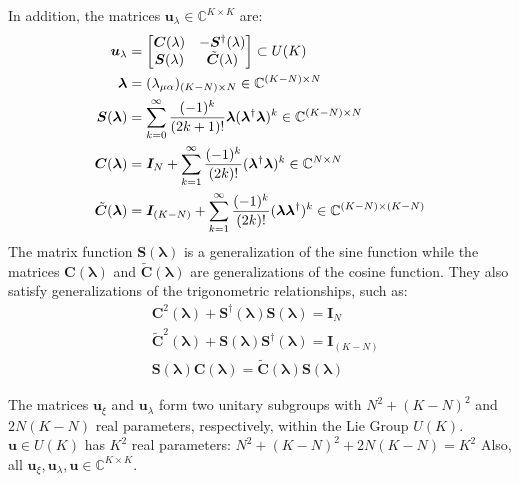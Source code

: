 \documentclass{aux/ttuthes2007}
\newcommand{\paren}[1]{\left( #1 \right)}
\newcommand{\elec}{N}
\newcommand{\orb}{K}
\newcommand{\uo}[1]{
		\IfEqCase{#1}{
			{0}{\mu}
			{1}{\nu}
			{2}{\xi}
		}[\PackageError{uo}{Undefined option to uo: #1}{}]
}
\newcommand{\oo}[1]{
		\IfEqCase{#1}{
			{0}{\alpha}
			{1}{\beta}
			{2}{\gamma}
		}[\PackageError{unocorb}{Undefined option to unuo: #1}{}]
}
\begin{document}
%
In addition, the matrices $\bm u_\lambda \in \mathbb{C}^{\orb \times \orb}$ are:
%
\begin{equation}
\begin{split}
	\label{eq:ulambda}
	\bm u_\lambda &= \begin{bmatrix}\bm C(\lambda) & -\bm S^\dagger(\lambda) \\ \bm S(\lambda) & \tilde {\bm C}(\lambda)\end{bmatrix} \subset U(\orb) \\
	\bm \lambda &= (\lambda_{\uo 0 \oo 0})_{(\orb - \elec)\times \elec} \in \mathbb{C}^{\paren{\orb - \elec} \times \elec} \\
	\bm S(\bm \lambda) &= \sum_{k=0}^\infty \frac{(-1)^k}{(2k + 1)!}\bm \lambda(\bm \lambda^\dagger\bm \lambda)^k \in \mathbb{C}^{\paren{\orb - \elec} \times \elec}\\
	\bm C(\bm \lambda) &= \bm I_\elec + \sum_{k=1}^\infty \frac{(-1)^k}{(2k)!}(\bm \lambda^\dagger\bm \lambda)^k \in \mathbb{C}^{\elec \times \elec}\\
	\tilde {\bm C}(\bm \lambda) &= \bm I_{(\orb - \elec)} + \sum_{k=1}^\infty \frac{(-1)^k}{(2k)!}(\bm \lambda\bm \lambda^\dagger)^k \in \mathbb{C}^{\paren{\orb - \elec} \times \paren{\orb - \elec}}
\end{split}
\end{equation}
%
The matrix function $\bm S(\bm \lambda)$ is a generalization of the sine function while the matrices $\bm C(\bm \lambda)$ and $\tilde {\bm C}(\bm \lambda)$ are generalizations of the cosine function. They also satisfy generalizations of the trigonometric relationships, such as:
%
\begin{equation*}
\begin{split}
	&\bm C^2(\bm \lambda) + \bm S^\dagger(\bm \lambda)\bm S(\bm \lambda) = \bm I_{\elec} \\
	&\tilde{\bm C}^2(\bm \lambda) + \bm S(\bm \lambda)\bm S^\dagger(\bm \lambda) = \bm I_{\paren{\orb - \elec}} \\
	&\bm S(\bm \lambda)\bm C(\bm \lambda) = \tilde{\bm C}(\bm \lambda)\bm S(\bm \lambda)
\end{split}
\end{equation*}

The matrices $\bm u_\xi$ and $\bm u_\lambda$ form two unitary subgroups with 
$\elec^2 + \paren{\orb - \elec}^2$ 
and 
$2\elec\paren{\orb - \elec}$
real parameters, respectively, within the Lie Group 
$U(\orb)$. $\bm u \in U(\orb)$ has $\orb^2$ real parameters:
$\elec^2 + \paren{\orb - \elec}^2 + 2\elec\paren{\orb - \elec} = \orb^2$
Also, all 
$\bm u_\xi, \bm u_\lambda, \bm u \in \mathbb{C}^{\orb\times\orb}$.
\end{document}
